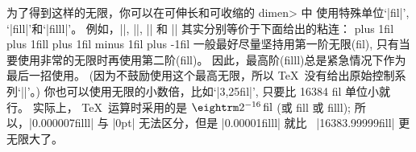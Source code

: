 \danger 为了得到这样的无限，你可以在可伸长和可收缩的 \<dimen> 中%
使用特殊单位`|fil|', `|fill|'和`|filll|'。%
例如，|\vfil|, |\vfill|, |\vss| 和 |\vfilneg| 其实分别等价于下面给出的粘连：
\begintt
\vskip 0pt plus 1fil
\vskip 0pt plus 1fill
\vskip 0pt plus 1fil minus 1fil
\vskip 0pt plus -1fil
\endtt
一般最好尽量坚持用第一阶无限(fil), 只有当要使用非常的无限时再使用第二阶(fill)。%
因此，最高阶(filll)总是紧急情况下作为最后一招使用。%
(因为不鼓励使用这个最高无限，所以 \TeX\ 没有给出原始控制系列`|\vfilll|'。)
你也可以使用无限的小数倍，比如`|3,25fil|', 只要比 16384 fil 单位小就行。%
实际上， \TeX\ 运算时采用的是 $\rm2^{-16}\,fil$
(或 fill 或 filll);
所以，|0.000007filll| 与 |0pt| 无法区分，但是 |0.00001filll| 就比%
~|16383.99999fill| 更无限大了。

